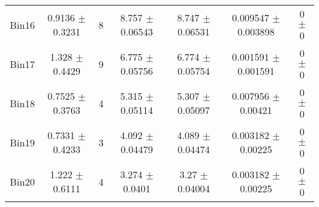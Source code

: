 \begin{tabular}{@{\extracolsep{4pt}}lcccccc@{}}
     Bin16 & 0.9136 $\pm$ 0.3231 & 8 & 8.757 $\pm$ 0.06543 & 8.747 $\pm$ 0.06531 & 0.009547 $\pm$ 0.003898 & 0 $\pm$ 0 \\ 
     Bin17 & 1.328 $\pm$ 0.4429 & 9 & 6.775 $\pm$ 0.05756 & 6.774 $\pm$ 0.05754 & 0.001591 $\pm$ 0.001591 & 0 $\pm$ 0 \\ 
     Bin18 & 0.7525 $\pm$ 0.3763 & 4 & 5.315 $\pm$ 0.05114 & 5.307 $\pm$ 0.05097 & 0.007956 $\pm$ 0.00421 & 0 $\pm$ 0 \\ 
     Bin19 & 0.7331 $\pm$ 0.4233 & 3 & 4.092 $\pm$ 0.04479 & 4.089 $\pm$ 0.04474 & 0.003182 $\pm$ 0.00225 & 0 $\pm$ 0 \\ 
     Bin20 & 1.222 $\pm$ 0.6111 & 4 & 3.274 $\pm$ 0.0401 & 3.27 $\pm$ 0.04004 & 0.003182 $\pm$ 0.00225 & 0 $\pm$ 0 \\ 
\hline\hline
  \end{tabular}
